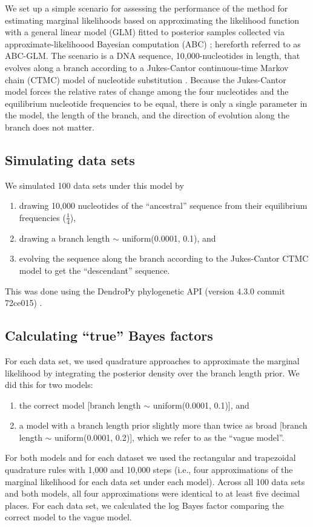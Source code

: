 We set up a simple scenario for assessing the performance of the method for
estimating marginal likelihoods based on approximating the likelihood function
with a general linear model (GLM) fitted to posterior samples collected via
approximate-likelihoood Bayesian computation (ABC) \citep{Leuenberger2010};
hereforth referred to as ABC-GLM.
The scenario is a DNA sequence, 10,000-nucleotides in length, that evolves
along a branch according to a Jukes-Cantor continuous-time Markov chain (CTMC)
model of nucleotide substitution \citep{JC1969}.
Because the Jukes-Cantor model forces the relative rates of change among the
four nucleotides and the equilibrium nucleotide frequencies to be equal, there
is only a single parameter in the model, the length of the branch, and the
direction of evolution along the branch does not matter.

\subsection{Simulating data sets}
We simulated 100 data sets under this model by
\begin{enumerate}
    \item drawing 10,000 nucleotides of the ``ancestral'' sequence from their
        equilibrium frequencies ($\frac{1}{4}$), 
    \item drawing a branch length $\sim$ uniform(0.0001, 0.1), and
    \item evolving the sequence along the branch according to the Jukes-Cantor
        CTMC model to get the ``descendant'' sequence.
\end{enumerate}
This was done using the DendroPy phylogenetic API (version 4.3.0 commit
72ce015) \citep{Sukumaran2010}.

\subsection{Calculating ``true'' Bayes factors}
For each data set, we used quadrature approaches to approximate the marginal
likelihood by integrating the posterior density over the branch length prior.
We did this for two models:
\begin{enumerate}
    \item the correct model [branch length $\sim$ uniform(0.0001, 0.1)], and
    \item a model with a branch length prior slightly more than twice as broad
        [branch length $\sim$ uniform(0.0001, 0.2)], which we refer to as the
        ``vague model''.
\end{enumerate}
For both models and for each dataset we used the rectangular and trapezoidal
quadrature rules with 1,000 and 10,000 steps (i.e., four approximations of the
marginal likelihood for each data set under each model).
Across all 100 data sets and both models, all four approximations were
identical to at least five decimal places.
For each data set, we calculated the log Bayes factor comparing the correct
model to the vague model.

